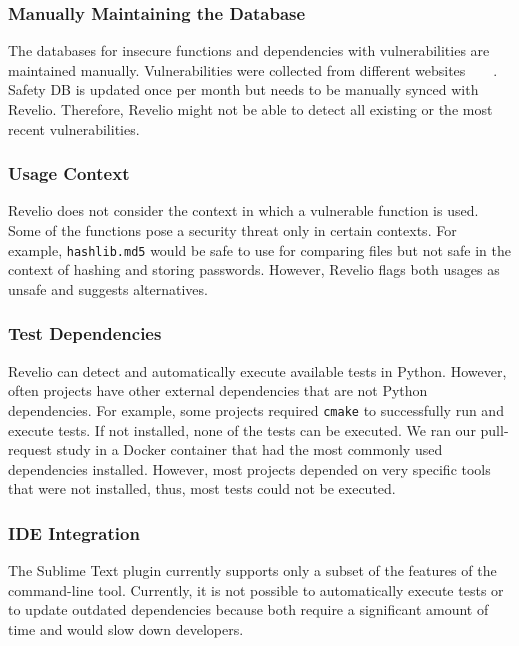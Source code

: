 \subsubsection{Manually Maintaining the Database}

The databases for insecure functions and dependencies with vulnerabilities are maintained manually. Vulnerabilities were collected from different websites~\cite{openstack}~\cite{cvedetails}~\cite{securitytracker}~\cite{exploitablepython}. Safety DB is updated once per month but needs to be manually synced with Revelio. Therefore, Revelio might not be able to detect all existing or the most recent vulnerabilities.

\subsubsection{Usage Context}

Revelio does not consider the context in which a vulnerable function is used. Some of the functions pose a security threat only in certain contexts. For example, \texttt{hashlib.md5} would be safe to use for comparing files but not safe in the context of hashing and storing passwords. However, Revelio flags both usages as unsafe and suggests alternatives.

\subsubsection{Test Dependencies}

Revelio can detect and automatically execute available tests in Python. However, often projects have other external dependencies that are not Python dependencies. For example, some projects required \texttt{cmake} to successfully run and execute tests. If not installed, none of the tests can be executed. We ran our pull-request study in a Docker container that had the most commonly used dependencies installed. However, most projects depended on very specific tools that were not installed, thus, most tests could not be executed.  

\subsubsection{IDE Integration}

The Sublime Text plugin currently supports only a subset of the features of the command-line tool. Currently, it is not possible to automatically execute tests or to update outdated dependencies because both require a significant amount of time and would slow down developers. 
